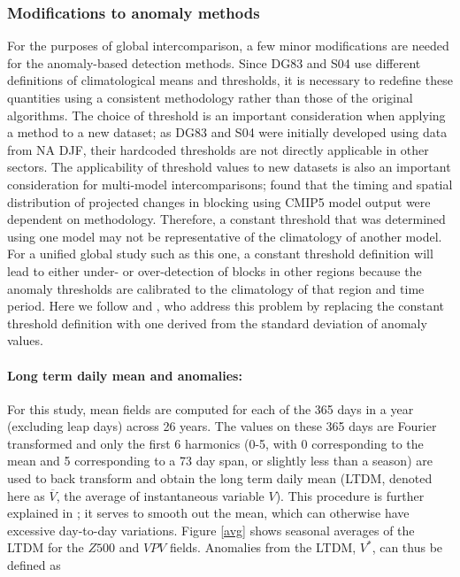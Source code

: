 \documentclass[smallextended]{svjour3}       %
\numberwithin{equation}{section}
\begin{document}
\subsubsection{Modifications to anomaly methods}\label{modanom}

For the purposes of global intercomparison, a few minor modifications are needed for the anomaly-based detection methods. Since DG83 and S04 use different definitions of climatological means and thresholds, it is necessary to redefine these quantities using a consistent methodology rather than those of the original algorithms. The choice of threshold is an important consideration when applying a method to a new dataset; as DG83 and S04 were initially developed using data from NA DJF, their hardcoded thresholds are not directly applicable in other sectors. {\color{blue} The applicability of threshold values to new datasets is also an important consideration for multi-model intercomparisons;  \cite{woollings_blocking_2018} found that the timing and spatial distribution of projected changes in blocking using CMIP5 model output were dependent on methodology. Therefore, a constant threshold that was determined using one model may not be representative of the climatology of another model. }%
For a unified global study such as this one, a constant threshold definition will lead to either under- or over-detection of blocks in other regions because the anomaly thresholds are calibrated to the climatology of that region and time period. Here we follow \cite{barriopedro_application_2010} and \cite{dunn-sigouin_evaluation_2012}, who address this problem by replacing the constant threshold definition with one derived from the standard deviation of anomaly values. 

\paragraph{Long term daily mean and anomalies:}  For this study, mean fields are computed for each of the 365 days in a year (excluding leap days) across 26 years. The values on these 365 days are Fourier transformed and only the first 6 harmonics {\color{blue}(0-5, with 0 corresponding to the mean and 5 corresponding to a 73 day span, or slightly less than a season)} are used to back transform and obtain the long term daily mean (LTDM, denoted here as $\overline{V}$, the average of instantaneous variable $V$). This procedure is further explained in \cite{grotjahn_synoptic_2017}; it serves to smooth out the mean, which can otherwise have excessive day-to-day variations. 
Figure \ref{avg} shows seasonal averages of the LTDM for the $Z500$ and $VPV$ fields. Anomalies from the LTDM, $V^*$, can thus be defined as 
\end{document}
